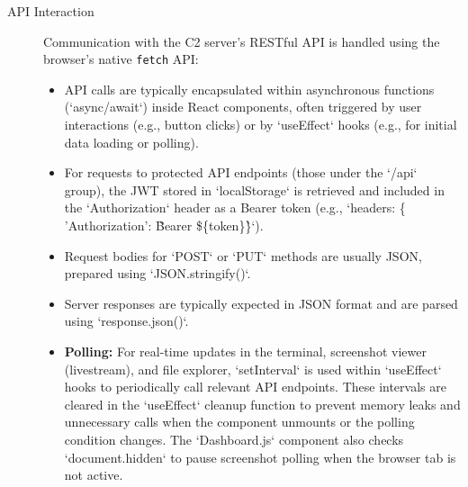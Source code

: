 \begin{description}
    \item[API Interaction]
    Communication with the C2 server's RESTful API is handled using the browser's native \texttt{fetch} API:
    \begin{itemize}
        \item API calls are typically encapsulated within asynchronous functions (`async/await`) inside React components, often triggered by user interactions (e.g., button clicks) or by `useEffect` hooks (e.g., for initial data loading or polling).
        \item For requests to protected API endpoints (those under the `/api` group), the JWT stored in `localStorage` is retrieved and included in the `Authorization` header as a Bearer token (e.g., `headers: \{ 'Authorization': \`Bearer \$\{token\}\` \}`).
        \item Request bodies for `POST` or `PUT` methods are usually JSON, prepared using `JSON.stringify()`.
        \item Server responses are typically expected in JSON format and are parsed using `response.json()`.
        \item \textbf{Polling:} For real-time updates in the terminal, screenshot viewer (livestream), and file explorer, `setInterval` is used within `useEffect` hooks to periodically call relevant API endpoints. These intervals are cleared in the `useEffect` cleanup function to prevent memory leaks and unnecessary calls when the component unmounts or the polling condition changes. The `Dashboard.js` component also checks `document.hidden` to pause screenshot polling when the browser tab is not active.
    \end{itemize}


\end{description}
